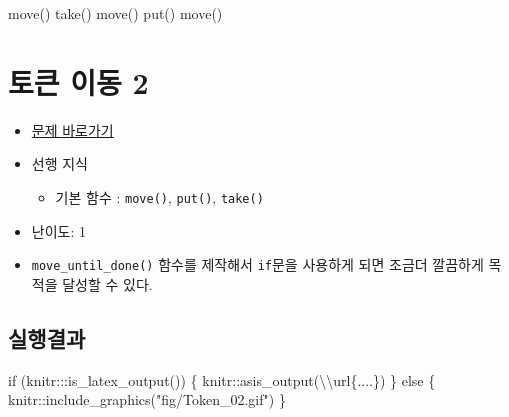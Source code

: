 \documentclass[
  b5paperpaper,
  DIV=11,
  numbers=noendperiod]{scrreprt}
\newenvironment{Shaded}{\begin{snugshade}}{\end{snugshade}}
\newcommand{\ControlFlowTok}[1]{\textcolor[rgb]{0.00,0.23,0.31}{#1}}
\newcommand{\FunctionTok}[1]{\textcolor[rgb]{0.28,0.35,0.67}{#1}}
\newcommand{\NormalTok}[1]{\textcolor[rgb]{0.00,0.23,0.31}{#1}}
\newcommand{\SpecialCharTok}[1]{\textcolor[rgb]{0.37,0.37,0.37}{#1}}
\newcommand{\StringTok}[1]{\textcolor[rgb]{0.13,0.47,0.30}{#1}}
\providecommand{\tightlist}{%
  \setlength{\itemsep}{0pt}\setlength{\parskip}{0pt}}\usepackage{longtable,booktabs,array}
\begin{document}
\begin{Shaded}
\begin{Highlighting}[]
\NormalTok{move()}
\NormalTok{take()}
\NormalTok{move()}
\NormalTok{put()}
\NormalTok{move()}
\end{Highlighting}
\end{Shaded}

\hypertarget{token-02}{%
\section{토큰 이동 2}\label{token-02}}

\begin{itemize}
\tightlist
\item
  \href{https://reeborg.ca/reeborg.html?lang=ko-en\&mode=python\&menu=worlds\%2Fmenus\%2Freeborg_intro_en.json\&name=Tokens\%202\&url=worlds\%2Ftutorial_en\%2Ftokens2.json}{문제
  바로가기}
\item
  선행 지식

  \begin{itemize}
  \tightlist
  \item
    기본 함수 : \texttt{move()}, \texttt{put()}, \texttt{take()}
  \end{itemize}
\item
  난이도: 1
\item
  \texttt{move\_until\_done()} 함수를 제작해서 \texttt{if}문을 사용하게
  되면 조금더 깔끔하게 목적을 달성할 수 있다.
\end{itemize}

\hypertarget{uxc2e4uxd589uxacb0uxacfc-16}{%
\subsection{실행결과}\label{uxc2e4uxd589uxacb0uxacfc-16}}

\begin{Shaded}
\begin{Highlighting}[]
\ControlFlowTok{if}\NormalTok{ (knitr}\SpecialCharTok{:::}\FunctionTok{is\_latex\_output}\NormalTok{()) \{}
\NormalTok{  knitr}\SpecialCharTok{::}\FunctionTok{asis\_output}\NormalTok{(}\StringTok{\textquotesingle{}}\SpecialCharTok{\textbackslash{}\textbackslash{}}\StringTok{url\{....\}\textquotesingle{}}\NormalTok{)}
\NormalTok{\} }\ControlFlowTok{else}\NormalTok{ \{}
\NormalTok{  knitr}\SpecialCharTok{::}\FunctionTok{include\_graphics}\NormalTok{(}\StringTok{"fig/Token\_02.gif"}\NormalTok{)}
\NormalTok{\}}
\end{Highlighting}
\end{Shaded}
\end{document}
